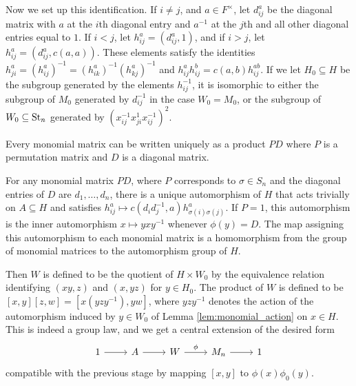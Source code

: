 Now we set up this identification. If $i \neq j$, and $a \in F^\times$, let $d_{ij}^a$ be the diagonal matrix with $a$ at the $i$th diagonal entry and $a^{-1}$ at the $j$th and all other diagonal entries equal to $1$. If $i < j$, let $h_{ij}^a = (d_{ij}^a, 1)$, and if $i > j$, let $h_{ij}^a = (d_{ij}^a, c(a, a))$. These elements satisfy the identities $h_{ji}^a = (h_{ij}^a)^{-1} = (h_{ik}^a)^{-1} (h_{kj}^a)^{-1}$ and $h_{ij}^a h_{ij}^b = c(a, b) h_{ij}^{ab}$. If we let $H_0 \subseteq H$ be the subgroup generated by the elements $h_{ij}^{-1}$, it is isomorphic to either the subgroup of $M_0$ generated by $d_{ij}^{-1}$ in the case $W_0 = M_0$, or the subgroup of $W_0 \subseteq \mathrm{St}_n$ generated by $(x_{ij}^{-1} x_{ji}^1 x_{ij}^{-1})^2$.

Every monomial matrix can be written uniquely as a product $PD$ where $P$ is a permutation matrix and $D$ is a diagonal matrix.
\begin{lemma}
    \label{lem:monomial_action}
    For any monomial matrix $PD$, where $P$ corresponds to $\sigma \in S_n$ and the diagonal entries of $D$ are $d_1, \ldots, d_n$, there is a unique automorphism of $H$ that acts trivially on $A \subseteq H$ and satisfies $h_{ij}^a \mapsto c(d_id_j^{-1}, a) h_{\sigma(i)\sigma(j)}^a$. If $P = 1$, this automorphism is the inner automorphism $x \mapsto yxy^{-1}$ whenever $\phi(y) = D$. The map assigning this automorphism to each monomial matrix is a homomorphism from the group of monomial matrices to the automorphism group of $H$.
\end{lemma}

Then $W$ is defined to be the quotient of $H \times W_0$ by the equivalence relation identifying $(xy, z)$ and $(x, yz)$ for $y \in H_0$. The product of $W$ is defined to be $[x, y][z, w] = [x(yzy^{-1}), yw]$, where $yzy^{-1}$ denotes the action of the automorphism induced by $y \in W_0$ of Lemma \ref{lem:monomial_action} on $x \in H$. This is indeed a group law, and we get a central extension of the desired form
\[
\begin{tikzcd}
    \arrow[from=1-1, to=1-2]
    \arrow[from=1-2, to=1-3]
    \arrow["{\phi}", from=1-3, to=1-4]
    \arrow[from=1-4, to=1-5]
    1 & A & W & M_n & 1
\end{tikzcd}
\]
compatible with the previous stage by mapping $[x, y]$ to $\phi(x)\phi_0(y)$.

